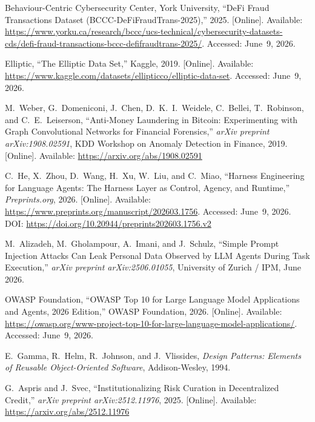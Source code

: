 \documentclass[12pt, a4paper]{report}
\begin{document}
{\begin{enumerate}[label={[\arabic*]}]
\item Behaviour-Centric Cybersecurity Center, York University, ``DeFi Fraud Transactions Dataset (BCCC-DeFiFraudTrans-2025),'' 2025. [Online]. Available: \url{https://www.yorku.ca/research/bccc/ucs-technical/cybersecurity-datasets-cds/defi-fraud-transactions-bccc-defifraudtrans-2025/}. Accessed: June~9, 2026.

\item Elliptic, ``The Elliptic Data Set,'' Kaggle, 2019. [Online]. Available: \url{https://www.kaggle.com/datasets/ellipticco/elliptic-data-set}. Accessed: June~9, 2026.

\item M.~Weber, G.~Domeniconi, J.~Chen, D.~K.~I.~Weidele, C.~Bellei, T.~Robinson, and C.~E.~Leiserson, ``Anti-Money Laundering in Bitcoin: Experimenting with Graph Convolutional Networks for Financial Forensics,'' \textit{arXiv preprint arXiv:1908.02591}, KDD Workshop on Anomaly Detection in Finance, 2019. [Online]. Available: \url{https://arxiv.org/abs/1908.02591}

\item C.~He, X.~Zhou, D.~Wang, H.~Xu, W.~Liu, and C.~Miao, ``Harness Engineering for Language Agents: The Harness Layer as Control, Agency, and Runtime,'' \textit{Preprints.org}, 2026. [Online]. Available: \url{https://www.preprints.org/manuscript/202603.1756}. Accessed: June~9, 2026. DOI: \url{https://doi.org/10.20944/preprints202603.1756.v2}

\item M.~Alizadeh, M.~Gholampour, A.~Imani, and J.~Schulz, ``Simple Prompt
Injection Attacks Can Leak Personal Data Observed by LLM Agents During Task
Execution,'' \textit{arXiv preprint arXiv:2506.01055}, University of Zurich / IPM,
June 2026.

\item OWASP Foundation, ``OWASP Top 10 for Large Language Model Applications and
Agents, 2026 Edition,'' OWASP Foundation, 2026. [Online]. Available:
\url{https://owasp.org/www-project-top-10-for-large-language-model-applications/}. Accessed: June~9, 2026.

\item E.~Gamma, R.~Helm, R.~Johnson, and J.~Vlissides, \textit{Design Patterns:
Elements of Reusable Object-Oriented Software}, Addison-Wesley, 1994.

\item G.~Aspris and J.~Svec, ``Institutionalizing Risk Curation in Decentralized Credit,'' \textit{arXiv preprint arXiv:2512.11976}, 2025. [Online]. Available: \url{https://arxiv.org/abs/2512.11976}


\end{enumerate}}
\end{document}
